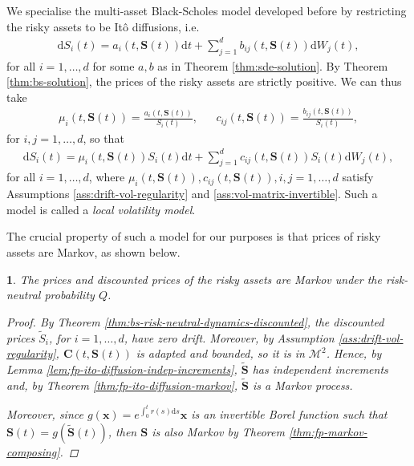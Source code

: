 \documentclass[english]{article}
\numberwithin{equation}{section}
\numberwithin{figure}{section}
\theoremstyle{bolddescit}
\newtheorem{theorem}{\protect\theoremname}[section]
\theoremstyle{definition}
\theoremstyle{definition}
\theoremstyle{plain}
\theoremstyle{plain}
\theoremstyle{bolddesc}
\theoremstyle{plain}
\theoremstyle{remark}
\providecommand{\theoremname}{Theorem}
\begin{document}
We specialise the multi-asset Black-Scholes model developed before by restricting the risky assets to be It\^o diffusions, i.e.
\begin{align*}
  \mathrm{d}S_i(t) = a_i(t,\mathbf{S}(t)) \mathrm{d}t + \sum_{j=1}^{d} b_{ij}(t,\mathbf{S}(t)) \mathrm{d}W_j(t),
\end{align*}
for all $i=1,\ldots,d$ for some $a,b$ as in Theorem \ref{thm:sde-solution}. By Theorem \ref{thm:bs-solution}, the prices of the risky assets are strictly positive. We can thus take
\begin{align*}
  \mu_i(t,\mathbf{S}(t)) = \frac{a_i(t, \mathbf{S}(t))}{S_i(t)},
  && c_{ij}(t,\mathbf{S}(t)) = \frac{b_{ij}(t, \mathbf{S}(t))}{S_i(t)},
\end{align*}
for $i,j=1,\ldots,d$, so that
\begin{align*}
  \mathrm{d}S_i(t) = \mu_i(t,\mathbf{S}(t)) S_i(t) \mathrm{d}t + \sum_{j=1}^{d} c_{ij}(t,\mathbf{S}(t)) S_i(t) \mathrm{d}W_j(t),
\end{align*}
for all $i=1,\ldots,d$, where $\mu_i(t,\mathbf{S}(t)), c_{ij}(t,\mathbf{S}(t)), i,j=1,\ldots,d$ satisfy Assumptions \ref{ass:drift-vol-regularity} and \ref{ass:vol-matrix-invertible}. Such a model is called a \textit{local volatility model}.

The crucial property of such a model for our purposes is that prices of risky assets are Markov, as shown below.

\begin{theorem}\label{thm:local-stock-prices-markov}
  The prices and discounted prices of the risky assets are Markov under the risk-neutral probability $Q$.

  \begin{proof}
    By Theorem \ref{thm:bs-risk-neutral-dynamics-discounted}, the discounted prices $\widetilde{S}_i$, for $i=1,\ldots,d$, have zero drift. Moreover, by Assumption \ref{ass:drift-vol-regularity}, $\mathbf{C}(t,\mathbf{S}(t))$ is adapted and bounded, so it is in $\mathcal{M}^2$. Hence, by Lemma \ref{lem:fp-ito-diffusion-indep-increments}, $\widetilde{\mathbf{S}}$ has independent increments and, by Theorem \ref{thm:fp-ito-diffusion-markov}, $\widetilde{\mathbf{S}}$ is a Markov process.

    Moreover, since $g(\mathbf{x}) = e^{\int_0^t r(s) \mathrm{d}s} \mathbf{x}$ is an invertible Borel function such that $\mathbf{S}(t) = g(\widetilde{\mathbf{S}}(t))$, then $\mathbf{S}$ is also Markov by Theorem \ref{thm:fp-markov-composing}.
  \end{proof}
\end{theorem}
\end{document}
